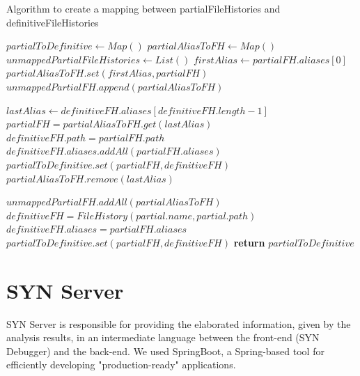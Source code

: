 \begin{algorithm}
    \caption{Algorithm to create a mapping between partialFileHistories and definitiveFileHistories}
    \begin{algorithmic}[1]
        \State $partialToDefinitive \gets Map()$
        \State $partialAliasToFH \gets Map()$ 
        \State $unmappedPartialFileHistories \gets List()$  
            \State $firstAlias \gets partialFH.aliases[0]$
                \State $partialAliasToFH.set(firstAlias, partialFH)$  
            \Else
                \State $unmappedPartialFH.append(partialAliasToFH)$  
            \EndIf
        \EndFor

         
            \State $lastAlias \gets definitiveFH.aliases[definitiveFH.length - 1]$
                \State $partialFH = partialAliasToFH.get(lastAlias)$
                \State $definitiveFH.path = partialFH.path$
                \State $definitiveFH.aliases.addAll(partialFH.aliases)$
                \State $partialToDefinitive.set(partialFH, definitiveFH)$
                \State $partialAliasToFH.remove(lastAlias)$
            \EndIf
        \EndFor

        \State $unmappedPartialFH.addAll(partialAliasToFH)$ 
            \State $definitiveFH = FileHistory(partial.name, partial.path)$
            \State $definitiveFH.aliases = partialFH.aliases $
            \State $partialToDefinitive.set(partialFH, definitiveFH)$
        \EndFor
        \State \textbf{return} $partialToDefinitive$
    \EndProcedure
    \end{algorithmic}
\end{algorithm}


\section{SYN Server}
SYN Server is responsible for providing the elaborated information, given by the analysis results, in an intermediate language between the 
front-end (SYN Debugger) and the back-end. We used SpringBoot, a Spring-based tool for efficiently developing "production-ready" applications.

